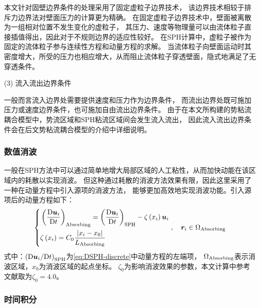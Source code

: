 本文针对固壁边界条件的处理采用了固定虚粒子边界技术\cite{marroneDSPHModelSimulating2011,adamiGeneralizedWallBoundary2012}，%
该边界技术相较于排斥力边界法\cite{monaghanSimulatingFreeSurface1994}对壁面压力的计算更为精确。%
在固定虚粒子边界技术中，壁面被离散为一组相对位置不发生变化的虚粒子，%
其压力、速度等物理量可以由流体粒子直接插值得出，因此对于不规则边界的适应性较好。%
在SPH计算中，虚粒子被作为固定的流体粒子参与连续性方程和动量方程的求解。%
当流体粒子向壁面运动时其密度增大，所受的压力也相应增大，从而阻止流体粒子穿透壁面，隐式地满足了无穿透条件。%

(3)	流入流出边界条件%

一般而言流入边界处需要提供速度和压力作为边界条件，%
而流出边界处既可施加压力或速度边界条件，也可施加自由流出边界条件。%
由于在本文所构建的势粘流耦合模型中，势流区域和SPH粘流区域间会发生流入流出，%
因此流入流出边界条件会在后文势粘流耦合模型的介绍中详细说明。

\subsubsection{
  \texorpdfstring{数值消波} %
  {\thesubsubsection 数值消波} %
}
\label{sssec:数值消波}

一般在SPH方法中可以通过简单地增大局部区域的人工粘性，从而加快动能在该区域内的耗散以实现消波。%
但这种通过耗散的消波方法效果有限，因此这里采用了一种在动量方程中引入源项的消波方法\cite{renNonlinearSimulationsWaveinduced2015}，%
能够更加高效地实现消波功能。引入源项后的动量方程如下：
\begin{equation}
  \left\{
    \begin{aligned}
      & \left(\frac{{\rm{D}}\bm{u}_i}{{\rm{D}}t}\right)_{\rm{Absorbing}} = %
      \left(\frac{{\rm{D}}\bm{u}_i}{{\rm{D}}t}\right)_{\rm{SPH}} - \zeta \left(x_i\right)\bm{u}_i \\
      & \zeta\left(x_i\right) = C_0 \frac{\left| x_i - x_0 \right|}{L_{\rm{Absorbing}}}
    \end{aligned}
  \right., %
  \quad \bm{r}_i \in \Omega_{\rm{Absorbing}}
\end{equation}
式中：$\left({\rm{D}}\bm{u}_i/{\rm{D}}t\right)_{\rm{SPH}}$为\cref{eq:DSPH-discrete}中动量方程的左端项，%
$\Omega_{\rm{Absorbing}}$表示消波区域，$x_0$为消波区域的起点坐标。%
$\zeta_0$为影响消波效果的参数，本文计算中参考文献\parencite{renNonlinearSimulationsWaveinduced2015}取为$\zeta_0 = 4.0$。

\subsubsection{
  \texorpdfstring{时间积分} %
  {\thesubsubsection 时间积分} %
}
\label{sssec:时间积分}

